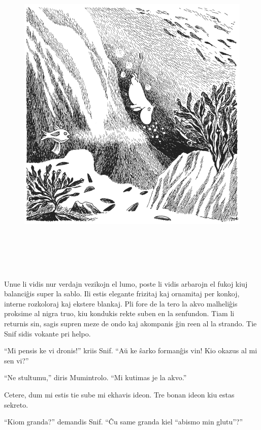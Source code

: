 \begin{figure}[htbp]
\centering
\includegraphics[width=450pt,height=459pt]{1-5.png}
\caption{}
\label{1-5}
\end{figure}

Unue li vidis nur verdajn vezikojn el lumo, poste li vidis arbarojn el fukoj kiuj balanciĝis super la sablo. Ili estis elegante frizitaj kaj ornamitaj per konkoj, interne rozkoloraj kaj ekstere blankaj. Pli fore de la tero la akvo malheliĝis proksime al nigra truo, kiu kondukis rekte suben en la senfundon. Tiam li returnis sin, sagis supren meze de ondo kaj akompanis ĝin reen al la strando. Tie Snif sidis vokante pri helpo.

``Mi pensis ke vi dronis!'' kriis Snif. ``Aŭ ke ŝarko formanĝis vin! Kio okazus al mi sen vi?''

``Ne stultumu,'' diris Mumintrolo. ``Mi kutimas je la akvo.''

Cetere, dum mi estis tie sube mi ekhavis ideon. Tre bonan ideon kiu estas sekreto.

``Kiom granda?'' demandis Snif. ``Ĉu same granda kiel ``abismo min glutu''?''


